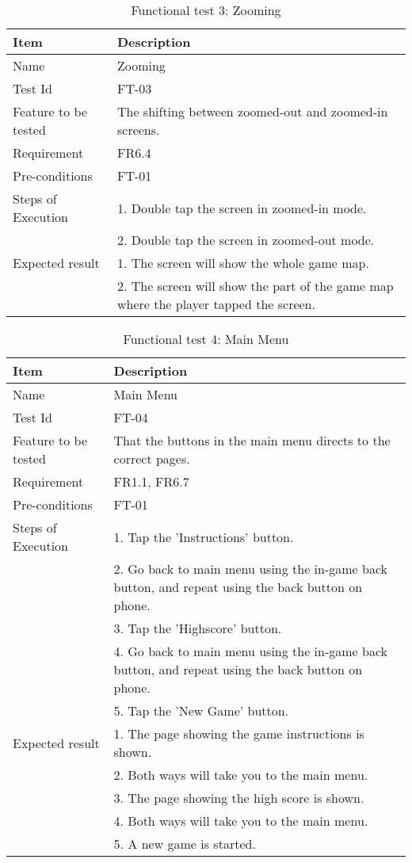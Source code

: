 \begin{table}[H]
\centering
	\begin{tabular}{ l | p{8cm} }
		\hline
		\rowcolor{lightgray}
		{\bf Item} & {\bf Description} \\ \hline
		Name & Zooming \\ 
		Test Id & FT-03 \\ 
		Feature to be tested & The shifting between zoomed-out and zoomed-in screens. \\ 
		Requirement & FR6.4 \\ 
		Pre-conditions & FT-01 \\ 
		Steps of Execution & 1. Double tap the screen in zoomed-in mode.\\ 
		& 2. Double tap the screen in zoomed-out mode. \\
		Expected result & 1. The screen will show the whole game map. \\
		& 2. The screen will show the part of the game map where the player tapped the screen. \\
		\hline
	\end{tabular}
	\caption{Functional test 3: Zooming}
\end{table}

\begin{table}[H]
\centering
	\begin{tabular}{ l | p{8cm} }
		\hline
		\rowcolor{lightgray}
		{\bf Item} & {\bf Description} \\ \hline
		Name & Main Menu \\ 
		Test Id & FT-04 \\ 
		Feature to be tested & That the buttons in the main menu directs to the correct pages. \\ 
		Requirement & FR1.1, FR6.7 \\ 
		Pre-conditions & FT-01 \\ 
		Steps of Execution & 1. Tap the 'Instructions' button. \\
		& 2. Go back to main menu using the in-game back button, and repeat using the back button on phone. \\
		& 3. Tap the 'Highscore' button. \\
		& 4. Go back to main menu using the in-game back button, and repeat using the back button on phone. \\
		& 5. Tap the 'New Game' button. \\
		Expected result & 1. The page showing the game instructions is shown. \\
		& 2. Both ways will take you to the main menu. \\
		& 3. The page showing the high score is shown. \\
		& 4. Both ways will take you to the main menu. \\
		& 5. A new game is started. \\
		\hline
	\end{tabular}
	\caption{Functional test 4: Main Menu}
\end{table}

